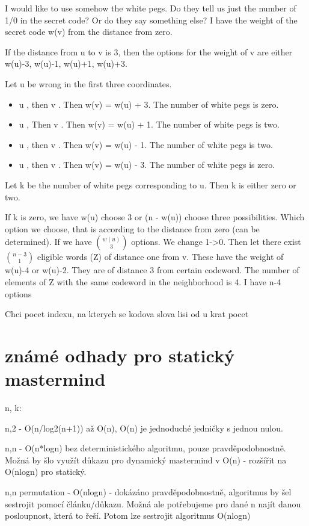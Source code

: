 I would like to use somehow the white pegs. Do they tell us just the number of 1/0 in the secret code? Or do they say something else? I have the weight of the secret code w(v) from the distance from zero. 

If the distance from u to v is 3, then the options for the weight of v are either w(u)-3, w(u)-1, w(u)+1, w(u)+3. 

Let u be wrong in the first three coordinates. 

\begin{itemize}
    \item u , then v . Then w(v) = w(u) + 3. The number of white pegs is zero. 
    \item u , Then v . Then w(v) = w(u) + 1. The number of white pegs is two.
    \item u , then v . Then w(v) = w(u) - 1. The number of white pegs is two. 
    \item u , then v . Then w(v) = w(u) - 3. The number of white pegs is zero. 
\end{itemize}

Let k be the number of white pegs corresponding to u. Then k is either zero or two. 

If k is zero, we have w(u) choose 3 or (n - w(u)) choose three possibilities. Which option we choose, that is according to the distance from zero (can be determined). If we have $\binom{w(u)}{3}$ options. We change 1->0. Then let there exist $\binom{n-3}{1}$ eligible words (Z) of distance one from v. These have the weight of w(u)-4 or w(u)-2. They are of distance 3 from certain codeword. The number of elements of Z with the same codeword in the neighborhood is 4. I have n-4 options 

Chci pocet indexu, na kterych se kodova slova lisi od u krat pocet 

\section{známé odhady pro statický mastermind}
n, k:

n,2 - O(n/log2(n+1)) až O(n), O(n) je jednoduché jedničky s jednou nulou. 

n,n - O(n*logn) bez deterministického algoritmu, pouze pravděpodobnostně. Možná by šlo využít důkazu pro dynamický mastermind v O(n) - rozšířit na O(nlogn) pro statický. 

n,n permutation - O(nlogn) - dokázáno pravděpodobnostně, algoritmus by šel sestrojit pomocí článku/důkazu. Možná ale potřebujeme pro dané n najít danou posloupnost, která to řeší. Potom lze sestrojit algoritmus O(nlogn)